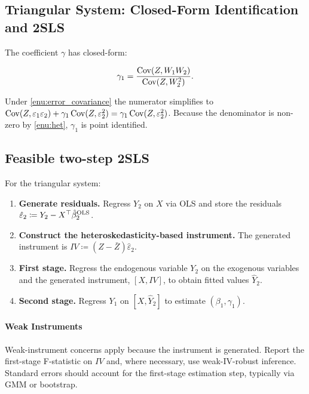 \subsection{Triangular System: Closed-Form Identification and 2SLS}

The coefficient $\gamma$ has closed-form:

\begin{equation}
\gamma_{1}=\frac{\operatorname{Cov}(Z,W_{1}W_{2})}{\operatorname{Cov}(Z,W_{2}^{2})}.\label{eq:gamma1_id}
\end{equation}

\begin{remark}
Under \ref{enu:error_covariance} the numerator simplifies to $\operatorname{Cov}(Z,\varepsilon_{1}\varepsilon_{2})+\gamma_{1}\operatorname{Cov}(Z,\varepsilon_{2}^{2})=\gamma_{1}\operatorname{Cov}(Z,\varepsilon_{2}^{2})$.
Because the denominator is non-zero by \ref{enu:het}, $\gamma_{1}$
is point identified. \end{remark}

\subsection{Feasible two-step 2SLS}

\label{subsec:2SLS}

For the triangular system:
\begin{enumerate}
\itemsep2pt
\item \textbf{Generate residuals.} Regress $Y_{2}$ on $X$ via OLS and
store the residuals $\hat{\varepsilon}_{2}\coloneqq Y_{2}-X^{\top}\hat{\beta}_{2}^{\text{OLS}}$.
\item \textbf{Construct the heteroskedasticity-based instrument.} The generated
instrument is $IV\coloneqq(Z-\bar{Z})\hat{\varepsilon}_{2}$.
\item \textbf{First stage.} Regress the endogenous variable $Y_{2}$ on
the exogenous variables and the generated instrument, $[X,IV]$, to
obtain fitted values $\hat{Y}_{2}$.
\item \textbf{Second stage.} Regress $Y_{1}$ on $[X,\hat{Y}_{2}]$ to estimate
$(\beta_{1},\gamma_{1})$.
\end{enumerate}

\paragraph{Weak Instruments}

Weak-instrument concerns apply because the instrument is generated.
Report the first-stage F-statistic on $IV$ and, where necessary,
use weak-IV-robust inference. Standard errors should account for the
first-stage estimation step, typically via GMM or bootstrap.

